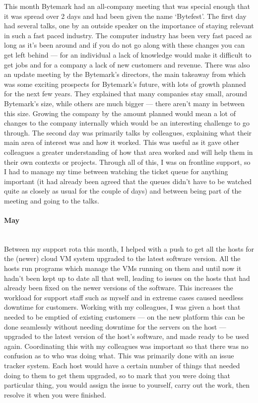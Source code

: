 \documentclass[12pt,a4paper]{article}
\newcommand{\paragraphnl}[1]{\paragraph{#1}\mbox{}\\}
\begin{document}
	This month Bytemark had an all-company meeting that was special enough that
	it was spread over 2 days and had been given the name `Bytefest'. The first
	day had several talks, one by an outside speaker on the importance of
	staying relevant in such a fast paced industry. The computer industry has
	been very fast paced as long as it's been around and if you do not go along
	with these changes you can get left behind --- for an individual a lack of
	knowledge would make it difficult to get jobs and for a company a lack of
	new customers and revenue. There was also an update meeting by the
	Bytemark's directors, the main takeaway from which was some exciting
	prospects for Bytemark's future, with lots of growth planned for the next
	few years. They explained that many companies stay small, around Bytemark's
	size, while others are much bigger --- there aren't many in between this
	size. Growing the company by the amount planned would mean a lot of changes
	to the company internally which would be an interesting challenge to go
	through. The second day was primarily talks by colleagues, explaining what
	their main area of interest was and how it worked. This was useful as it
	gave other colleagues a greater understanding of how that area worked and
	will help them in their own contexts or projects. Through all of this, I was
	on frontline support, so I had to manage my time between watching the ticket
	queue for anything important (it had already been agreed that the queues
	didn't have to be watched quite as closely as usual for the couple of days)
	and between being part of the meeting and going to the talks.

\paragraphnl{May}
	Between my support rota this month, I helped with a push to get all the
	hosts for the (newer) cloud VM system upgraded to the latest software
	version. All the hosts run programs which manage the VMs running on them and
	until now it hadn't been kept up to date all that well, leading to issues on
	the hosts that had already been fixed on the newer versions of the software.
	This increases the workload for support staff such as myself and in extreme
	cases caused needless downtime for customers. Working with my colleagues, I
	was given a host that needed to be emptied of existing customers --- on the
	new platform this can be done seamlessly without needing downtime for the
	servers on the host --- upgraded to the latest version of the host's
	software, and made ready to be used again. Coordinating this with my
	colleagues was important so that there was no confusion as to who was doing
	what. This was primarily done with an issue tracker system. Each host would
	have a certain number of things that needed doing to them to get them
	upgraded, so to mark that you were doing that particular thing, you would
	assign the issue to yourself, carry out the work, then resolve it when you
	were finished.
\end{document}
